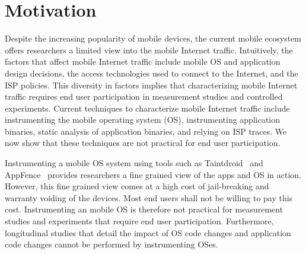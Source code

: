\section{Motivation}
\label{sec:motivation}


Despite the increasing popularity of mobile devices, the current mobile ecosystem offers researchers a limited view into the mobile Internet traffic.
Intuitively, the factors that affect mobile Internet traffic include mobile OS and application design decisions, the access technologies used to connect to the Internet, and the ISP policies. 
This diversity in factors implies that characterizing mobile Internet traffic requires end user participation in measurement studies and controlled experiments.
Current techniques to characterize mobile Internet traffic include instrumenting the mobile operating system (OS), instrumenting application binaries, static analysis of application binaries, and relying on ISP traces. 
We now show that these techniques are not practical for end user participation.

Instrumenting a mobile OS system using tools such as Taintdroid~\cite{enck:taintdroid} and AppFence~\cite{hornyack:appfence} provides researchers a fine grained view of the apps and OS in action. 
However, this fine grained view comes at a high cost of jail-breaking and warranty voiding of the devices.
Most end users shall not be willing to pay this cost. 
Instrumenting an mobile OS is therefore not practical for measurement studies and experiments that require end user participation. 
Furthermore, longitudinal studies that detail the impact of OS code changes and application code changes cannot be performed by instrumenting OSes.

